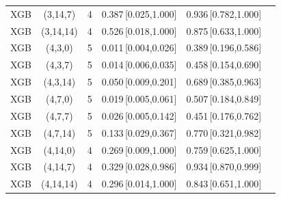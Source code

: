 \begin{longtable}{lccccc}
XGB & (3,14,7) & 4 & 0.387\,[0.025,1.000] & 0.936\,[0.782,1.000] \\
XGB & (3,14,14) & 4 & 0.526\,[0.018,1.000] & 0.875\,[0.633,1.000] \\
XGB & (4,3,0) & 5 & 0.011\,[0.004,0.026] & 0.389\,[0.196,0.586] \\
XGB & (4,3,7) & 5 & 0.014\,[0.006,0.035] & 0.458\,[0.154,0.690] \\
XGB & (4,3,14) & 5 & 0.050\,[0.009,0.201] & 0.689\,[0.385,0.963] \\
XGB & (4,7,0) & 5 & 0.019\,[0.005,0.061] & 0.507\,[0.184,0.849] \\
XGB & (4,7,7) & 5 & 0.026\,[0.005,0.142] & 0.451\,[0.176,0.762] \\
XGB & (4,7,14) & 5 & 0.133\,[0.029,0.367] & 0.770\,[0.321,0.982] \\
XGB & (4,14,0) & 4 & 0.269\,[0.009,1.000] & 0.759\,[0.625,1.000] \\
XGB & (4,14,7) & 4 & 0.329\,[0.028,0.986] & 0.934\,[0.870,0.999] \\
XGB & (4,14,14) & 4 & 0.296\,[0.014,1.000] & 0.843\,[0.651,1.000] \\
\end{longtable}
